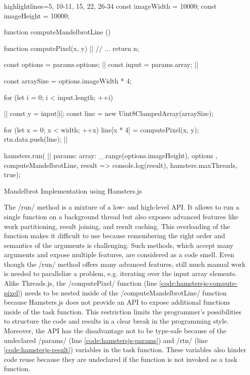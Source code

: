 \begin{listing}
\begin{javascriptcode*}{highlightlines={5, 10-11, 15, 22, 26-34}}
const imageWidth = 10000;
const imageHeight = 10000;

function computeMandelbrotLine () {
	function computePixel(x, y) {|$\label{code:hamstersjs-compute-pixel}$|
		// ...
		return n;
	}

	const options = params.options; |$\label{code:hamstersjs-params}$|
	const input = params.array; |$\label{code:hamstersjs-params-two}$|

	const arraySize = options.imageWidth * 4;

	for (let i = 0; i < input.length; ++i) {|$\label{code:hamsterjs-iterate}$|
		const y = input[i];
		const line = new Uint8ClampedArray(arraySize);
		
		for (let x = 0; x < width; ++x) {
			line[x * 4] = computePixel(x, y);
		}
		rtn.data.push(line); |$\label{code:hamsterjs-result}$|
	}
}

hamsters.run( |$\label{code:hamsterjs-start}$|
	params: {
		array: _.range(options.imageHeight),
		options
	},  
	computeMandelbrotLine, 
	result => console.log(result), 
	hamsters.maxThreads, 
	true);
\end{javascriptcode*}
\caption{Mandelbrot Implementation using Hamsters.js}
\label{fig:mandelbrot-hamsterjs}
\end{listing}

The \javascriptinline/run/ method is a mixture of a low- and high-level API. It allows to run a single function on a background thread but also exposes advanced features like work partitioning, result joining, and result caching. This overloading of the function makes it difficult to use because remembering the right order and semantics of the arguments is challenging. Such methods, which accept many arguments and expose multiple features, are considered as a code smell. Even though the \javascriptinline/run/ method offers many advanced features, still much manual work is needed to parallelize a problem, e.g. iterating over the input array elements. Alike Threads.js, the \javascriptinline/computePixel/ function (line \ref{code:hamstersjs-compute-pixel}) needs to be nested inside of the \javascriptinline/computeMandelbrotLine/ function because Hamsters.js does not provide an API to expose additional functions inside of the task function. This restriction limits the programmer's possibilities to structure the code and results in a clear break in the programming style. Moreover, the API has the disadvantage not to be type-safe because of the undeclared \javascriptinline/params/ (line \ref{code:hamstersjs-params}) and \javascriptinline/rtn/ (line \ref{code:hamsterjs-result}) variables in the task function. These variables also hinder code reuse because they are undeclared if the function is not invoked as a task function.

